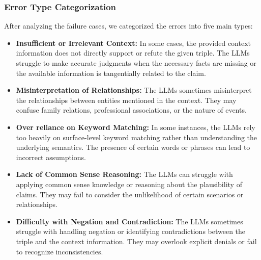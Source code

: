 \subsubsection{Error Type Categorization}
After analyzing the failure cases, we categorized the errors into five main types:
\begin{itemize}
    \item \textbf{Insufficient or Irrelevant Context:} In some cases, the provided context information does not directly support or refute the given triple. The LLMs struggle to make accurate judgments when the necessary facts are missing or the available information is tangentially related to the claim.
    \item \textbf{Misinterpretation of Relationships:} The LLMs sometimes misinterpret the relationships between entities mentioned in the context. They may confuse family relations, professional associations, or the nature of events.
    \item \textbf{Over reliance on Keyword Matching:} In some instances, the LLMs rely too heavily on surface-level keyword matching rather than understanding the underlying semantics. The presence of certain words or phrases can lead to incorrect assumptions.
    \item \textbf{Lack of Common Sense Reasoning:} The LLMs can struggle with applying common sense knowledge or reasoning about the plausibility of claims. They may fail to consider the unlikelihood of certain scenarios or relationships.
    \item \textbf{Difficulty with Negation and Contradiction:} The LLMs sometimes struggle with handling negation or identifying contradictions between the triple and the context information. They may overlook explicit denials or fail to recognize inconsistencies.
\end{itemize}

